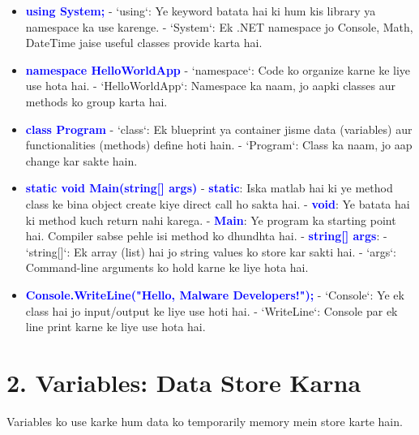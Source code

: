 \documentclass[12pt]{article}
\begin{document}
\begin{itemize}
    \item \textbf{\textcolor{blue}{using System;}}  
    - `using`: Ye keyword batata hai ki hum kis library ya namespace ka use karenge.  
    - `System`: Ek .NET namespace jo Console, Math, DateTime jaise useful classes provide karta hai.

    \item \textbf{\textcolor{blue}{namespace HelloWorldApp}}  
    - `namespace`: Code ko organize karne ke liye use hota hai.  
    - `HelloWorldApp`: Namespace ka naam, jo aapki classes aur methods ko group karta hai.

    \item \textbf{\textcolor{blue}{class Program}}  
    - `class`: Ek blueprint ya container jisme data (variables) aur functionalities (methods) define hoti hain.  
    - `Program`: Class ka naam, jo aap change kar sakte hain.

    \item \textbf{\textcolor{blue}{static void Main(string[] args)}}  
    - \textbf{\textcolor{blue}{static}}: Iska matlab hai ki ye method class ke bina object create kiye direct call ho sakta hai.  
    - \textbf{\textcolor{blue}{void}}: Ye batata hai ki method kuch return nahi karega.  
    - \textbf{\textcolor{blue}{Main}}: Ye program ka starting point hai. Compiler sabse pehle isi method ko dhundhta hai.  
    - \textbf{\textcolor{blue}{string[] args}}:  
        - `string[]`: Ek array (list) hai jo string values ko store kar sakti hai.  
        - `args`: Command-line arguments ko hold karne ke liye hota hai.

    \item \textbf{\textcolor{blue}{Console.WriteLine("Hello, Malware Developers!");}}  
    - `Console`: Ye ek class hai jo input/output ke liye use hoti hai.  
    - `WriteLine`: Console par ek line print karne ke liye use hota hai.
\end{itemize}

\section*{\textbf{2. Variables: Data Store Karna}}

Variables ko use karke hum data ko temporarily memory mein store karte hain.
\end{document}
